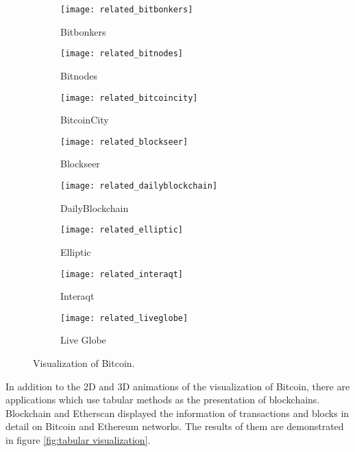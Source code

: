 \begin{figure}[htb]
    \centering
    \begin{subfigure}[b]{0.45\textwidth}
        \centering
        \texttt{[image: related\_bitbonkers]}
        \caption{Bitbonkers}
    \end{subfigure}
    \hfill
    \begin{subfigure}[b]{0.45\textwidth}
        \centering
        \texttt{[image: related\_bitnodes]}
        \caption{Bitnodes}
    \end{subfigure}

    \begin{subfigure}[b]{0.45\textwidth}
        \centering
        \texttt{[image: related\_bitcoincity]}
        \caption{BitcoinCity}
    \end{subfigure}
    \hfill
    \begin{subfigure}[b]{0.45\textwidth}
        \centering
        \texttt{[image: related\_blockseer]}
        \caption{Blockseer}
    \end{subfigure}

    \begin{subfigure}[b]{0.45\textwidth}
        \centering
        \texttt{[image: related\_dailyblockchain]}
        \caption{DailyBlockchain}
    \end{subfigure}
    \hfill
    \begin{subfigure}[b]{0.45\textwidth}
        \centering
        \texttt{[image: related\_elliptic]}
        \caption{Elliptic}
    \end{subfigure}

    \begin{subfigure}[b]{0.45\textwidth}
        \centering
        \texttt{[image: related\_interaqt]}
        \caption{Interaqt}
    \end{subfigure}
    \hfill
    \begin{subfigure}[b]{0.45\textwidth}
        \centering
        \texttt{[image: related\_liveglobe]}
        \caption{Live Globe}
    \end{subfigure}

    \caption{Visualization of Bitcoin.}
    \label{fig:visualization of bitcoin}
\end{figure}

In addition to the 2D and 3D animations of the visualization of Bitcoin, there are applications which use tabular methods as the presentation of blockchains. Blockchain \cite{blockchain} and Etherscan \cite{etherscan} displayed the information of transactions and blocks in detail on Bitcoin and Ethereum networks. The results of them are demonstrated in figure \ref{fig:tabular visualization}.

